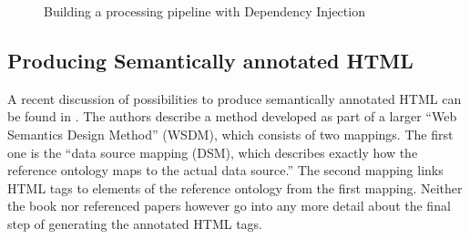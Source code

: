 \documentclass[11pt,a4paper,headsepline,twoside]{scrartcl}		%
\begin{document}
\begin{figure}[tbp]
  \caption{Building a processing pipeline with Dependency Injection}
  \label{fig:dependency-injection-pipeline}
\end{figure}



\subsection{Producing Semantically annotated HTML}
\label{sec:prod-semant-annot}


A recent discussion of possibilities to produce semantically annotated HTML can
be found in \cite[sec. 9.1.3]{DBLP:books/daglib/0023755}. The authors describe a
method developed as part of a larger ``Web Semantics Design Method'' (WSDM),
which consists of two mappings. The first one is the ``data source mapping
(DSM), which describes exactly how the reference ontology maps to the actual
data source.''  The second mapping links HTML tags to elements of the reference
ontology from the first mapping. Neither the book nor referenced papers however
go into any more detail about the final step of generating the annotated HTML
tags.
\end{document}
